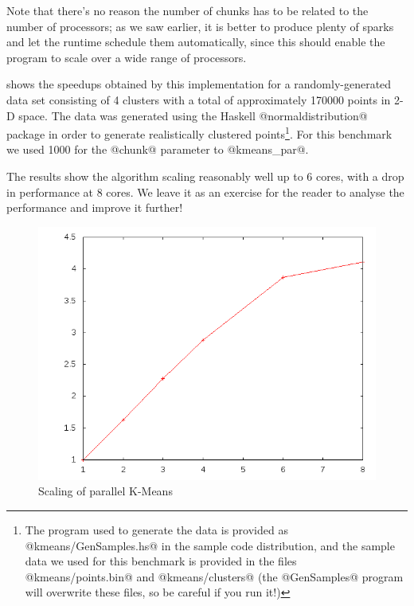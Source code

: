 Note that there's no reason the number of chunks has to be related to
the number of processors; as we saw earlier, it is better to produce
plenty of sparks and let the runtime schedule them automatically,
since this should enable the program to scale over a wide range of
processors.

 shows the speedups obtained by this
implementation for a randomly-generated data set consisting of 4
clusters with a total of approximately 170000 points in 2-D space.
The data was generated using the Haskell @normaldistribution@ package
in order to generate realistically clustered points\footnote{The
  program used to generate the data is provided as
  @kmeans/GenSamples.hs@ in the sample code distribution, and the
  sample data we used for this benchmark is provided in the files
  @kmeans/points.bin@ and @kmeans/clusters@ (the @GenSamples@ program
  will overwrite these files, so be careful if you run it!)}.  For this
benchmark we used 1000 for the @chunk@ parameter to @kmeans_par@.

The results show the algorithm scaling reasonably well up to 6 cores,
with a drop in performance at 8 cores.  We leave it as an exercise for
the reader to analyse the performance and improve it further!

\begin{figure}
\begin{center}
\includegraphics[scale=0.4]{kmeans-results.png}
\end{center}
\caption{Scaling of parallel K-Means}
\label{fig:kmeans-results}
\end{figure}

